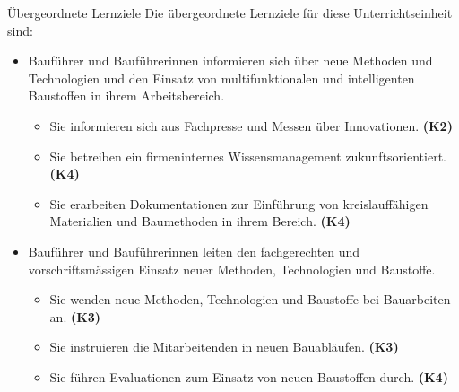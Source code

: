 \begin{frame}{Übergeordnete Lernziele}
    Die übergeordnete Lernziele für diese Unterrichtseinheit sind: 
    \begin{itemize}
        \item Bauführer und Bauführerinnen informieren sich über neue Methoden und Technologien und den Einsatz von
        multifunktionalen und intelligenten Baustoffen in ihrem Arbeitsbereich.
        \begin{itemize}
            \item Sie informieren sich aus Fachpresse und Messen über Innovationen. \textbf{(K2)}
            \item Sie betreiben ein firmeninternes Wissensmanagement zukunftsorientiert. \textbf{(K4)}
            \item Sie erarbeiten Dokumentationen zur Einführung von kreislauffähigen Materialien und Baumethoden
            in ihrem Bereich. \textbf{(K4)}
        \end{itemize}
        \item Bauführer und Bauführerinnen leiten den fachgerechten und vorschriftsmässigen Einsatz neuer Methoden, Technologien und Baustoffe.
        \begin{itemize}
            \item Sie wenden neue Methoden, Technologien und Baustoffe bei Bauarbeiten an. \textbf{(K3)}
            \item Sie instruieren die Mitarbeitenden in neuen Bauabläufen. \textbf{(K3)}
            \item Sie führen Evaluationen zum Einsatz von neuen Baustoffen durch. \textbf{(K4)}
        \end{itemize}
    \end{itemize}
\end{frame}
